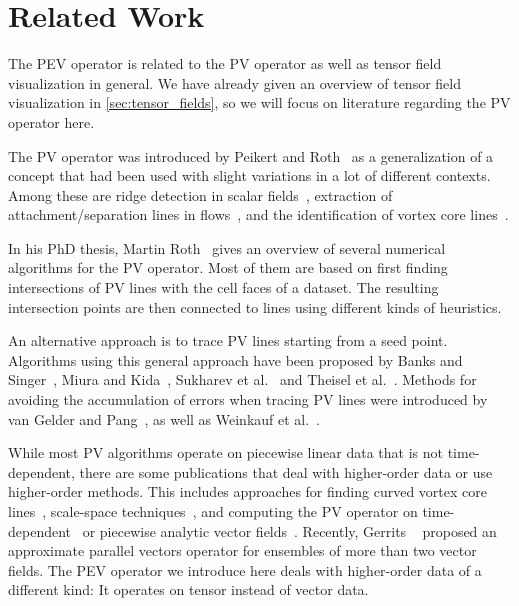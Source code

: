 \section{Related Work} %
\label{sec:pev_related_work}
%
The \ac{PEV} operator is related to the \ac{PV} operator as well as tensor field
visualization in general.
%
We have already given an overview of tensor field visualization in
\cref{sec:tensor_fields}, so we will focus on literature regarding the \ac{PV}
operator here.
%

%
The \ac{PV} operator was introduced by Peikert and Roth~\cite{Peikert1999} as a
generalization of a concept that had been used with slight variations in a lot
of different contexts.
%
Among these are ridge detection in scalar fields~\cite{Haralick1983},
extraction of attachment/separation lines in flows~\cite{Kenwright1999},
and the identification of vortex core lines~\cite{Sujudi1995,Banks1995}.
%

%
In his PhD thesis, Martin Roth~\cite{Roth2000} gives an overview of several
numerical algorithms for the \ac{PV} operator.
%
Most of them are based on first finding intersections of \ac{PV} lines with the
cell faces of a dataset.
%
The resulting intersection points are then connected to lines using different
kinds of heuristics.
%

%
An alternative approach is to trace \ac{PV} lines starting from a seed point.
%
Algorithms using this general approach have been proposed by Banks and
Singer~\cite{Banks1995}, Miura and Kida~\cite{Miura1997}, Sukharev et
al.~\cite{Sukharev2006} and Theisel et al.~\cite{Theisel2003a}.
%
Methods for avoiding the accumulation of errors when tracing \ac{PV} lines were
introduced by van Gelder and Pang~\cite{Gelder2009}, as well as Weinkauf et
al.~\cite{Weinkauf2011}.
%

%
While most \ac{PV} algorithms operate on piecewise linear data that is not
time-dependent, there are some publications that deal with higher-order data
or use higher-order methods.
%
This includes approaches for finding curved vortex core lines~\cite{Roth1998},
scale-space techniques~\cite{Bauer2002}, and computing the \ac{PV} operator on
time-dependent~\cite{Theisel2005,Fuchs2007} or piecewise analytic vector
fields~\cite{Pagot2011}.
%
Recently, Gerrits \etal{}~\cite{Gerrits2018} proposed an approximate parallel
vectors operator for ensembles of more than two vector fields.
%
The \ac{PEV} operator we introduce here deals with higher-order data of a
different kind: It operates on tensor instead of vector data.
%
